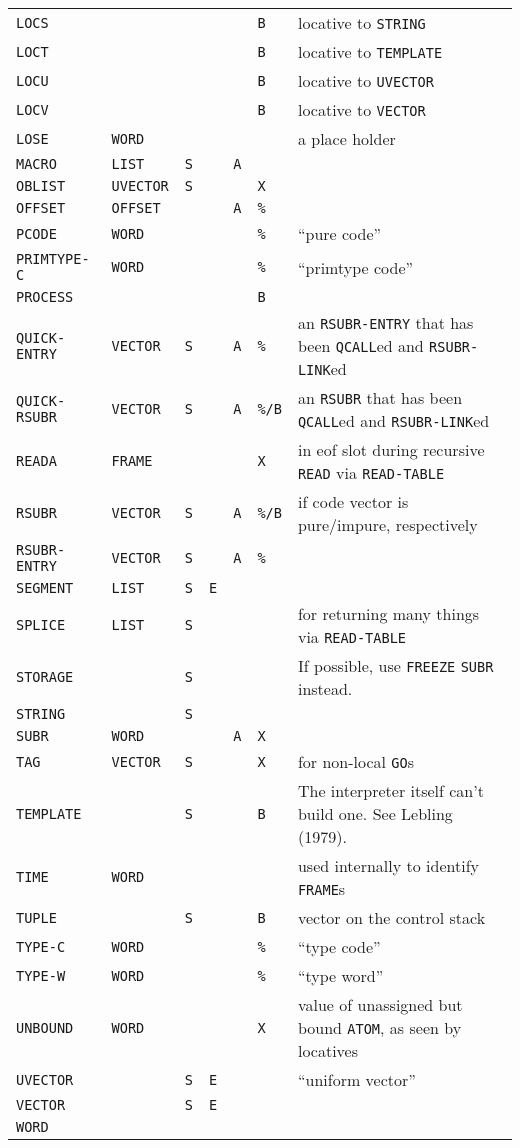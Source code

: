 \documentclass[a4paper,]{article}
\begin{document}
\begin{longtable}[]{@{}lllllll@{}}
\texttt{LOCS} & & & & & \texttt{B} & locative to \texttt{STRING}\tabularnewline
\texttt{LOCT} & & & & & \texttt{B} & locative to \texttt{TEMPLATE}\tabularnewline
\texttt{LOCU} & & & & & \texttt{B} & locative to \texttt{UVECTOR}\tabularnewline
\texttt{LOCV} & & & & & \texttt{B} & locative to \texttt{VECTOR}\tabularnewline
\texttt{LOSE} & \texttt{WORD} & & & & & a place holder\tabularnewline
\texttt{MACRO} & \texttt{LIST} & \texttt{S} & & \texttt{A} & &\tabularnewline
\texttt{OBLIST} & \texttt{UVECTOR} & \texttt{S} & & & \texttt{X} &\tabularnewline
\texttt{OFFSET} & \texttt{OFFSET} & & & \texttt{A} & \texttt{\%} &\tabularnewline
\texttt{PCODE} & \texttt{WORD} & & & & \texttt{\%} & ``pure code''\tabularnewline
\texttt{PRIMTYPE-C} & \texttt{WORD} & & & & \texttt{\%} & ``primtype code''\tabularnewline
\texttt{PROCESS} & & & & & \texttt{B} &\tabularnewline
\texttt{QUICK-ENTRY}\index{\texttt{QUICK-ENTRY}} & \texttt{VECTOR} & \texttt{S} & & \texttt{A} & \texttt{\%} & an
\texttt{RSUBR-ENTRY} that has been \texttt{QCALL}ed and \texttt{RSUBR-LINK}ed\tabularnewline
\texttt{QUICK-RSUBR}\index{\texttt{QUICK-RSUBR}} & \texttt{VECTOR} & \texttt{S} & & \texttt{A} & \texttt{\%/B} & an
\texttt{RSUBR} that has been \texttt{QCALL}ed and \texttt{RSUBR-LINK}ed\tabularnewline
\texttt{READA} & \texttt{FRAME} & & & & \texttt{X} & in eof slot during recursive \texttt{READ} via
\texttt{READ-TABLE}\tabularnewline
\texttt{RSUBR} & \texttt{VECTOR} & \texttt{S} & & \texttt{A} & \texttt{\%/B} & if code vector is pure/impure,
respectively\tabularnewline
\texttt{RSUBR-ENTRY} & \texttt{VECTOR} & \texttt{S} & & \texttt{A} & \texttt{\%} &\tabularnewline
\texttt{SEGMENT} & \texttt{LIST} & \texttt{S} & \texttt{E} & & &\tabularnewline
\texttt{SPLICE} & \texttt{LIST} & \texttt{S} & & & & for returning many things via \texttt{READ-TABLE}\tabularnewline
\texttt{STORAGE} & & \texttt{S} & & & & If possible, use \texttt{FREEZE} \texttt{SUBR} instead.\tabularnewline
\texttt{STRING} & & \texttt{S} & & & &\tabularnewline
\texttt{SUBR} & \texttt{WORD} & & & \texttt{A} & \texttt{X} &\tabularnewline
\texttt{TAG} & \texttt{VECTOR} & \texttt{S} & & & \texttt{X} & for non-local \texttt{GO}s\tabularnewline
\texttt{TEMPLATE} & & \texttt{S} & & & \texttt{B} & The interpreter itself can't build one. See Lebling
(1979).\tabularnewline
\texttt{TIME} & \texttt{WORD} & & & & & used internally to identify \texttt{FRAME}s\tabularnewline
\texttt{TUPLE} & & \texttt{S} & & & \texttt{B} & vector on the control stack\tabularnewline
\texttt{TYPE-C} & \texttt{WORD} & & & & \texttt{\%} & ``type code''\tabularnewline
\texttt{TYPE-W} & \texttt{WORD} & & & & \texttt{\%} & ``type word''\tabularnewline
\texttt{UNBOUND}\index{\texttt{UNBOUND}} & \texttt{WORD} & & & & \texttt{X} & value of unassigned but bound \texttt{ATOM},
as seen by locatives\tabularnewline
\texttt{UVECTOR} & & \texttt{S} & \texttt{E} & & & ``uniform vector''\tabularnewline
\texttt{VECTOR} & & \texttt{S} & \texttt{E} & & &\tabularnewline
\texttt{WORD} & & & & & &\tabularnewline
\bottomrule
\end{longtable}
\end{document}
